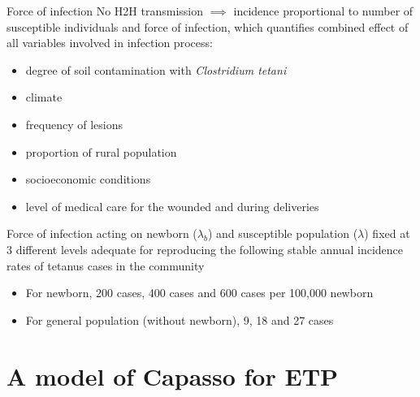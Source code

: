 \documentclass[aspectratio=169]{beamer}
\begin{document}
\begin{frame}{Force of infection}
  No H2H transmission $\implies$ incidence proportional to number of susceptible individuals and force of infection, which quantifies combined effect of all variables involved in infection process:
  \begin{itemize}
    \item degree of soil contamination with \emph{Clostridium tetani}
    \item climate
    \item frequency of lesions
    \item proportion of rural population
    \item socioeconomic conditions
    \item level of medical care for the wounded and during deliveries
  \end{itemize}

  Force of infection acting on newborn ($\lambda_b$) and susceptible population ($\lambda$) fixed at 3 different levels adequate for reproducing the following stable annual incidence rates of tetanus cases in the community
  \begin{itemize}
    \item For newborn, 200 cases, 400 cases and 600 cases per 100,000 newborn
    \item For general population (without newborn), 9, 18 and 27 cases
  \end{itemize}
\end{frame}


\section{A model of Capasso for ETP}
\end{document}
